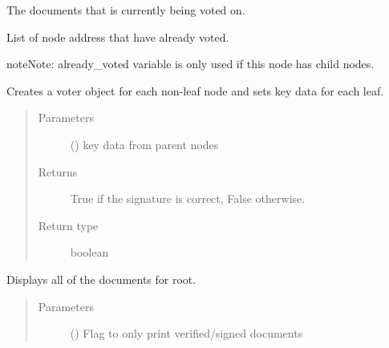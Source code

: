 \documentclass[letterpaper,10pt,english]{sphinxmanual}
\begin{document}
\begin{fulllineitems}
\begin{fulllineitems}
\label{\detokenize{index:ThresTree.TreeNode.current_vote}}
 \textendash{} The documents that is currently being voted on.

\end{fulllineitems}


\begin{fulllineitems}
\label{\detokenize{index:ThresTree.TreeNode.already_voted}}
 \textendash{} List of node address that have already voted.

\end{fulllineitems}


\begin{sphinxadmonition}{note}{Note:}
already\_voted variable is only used if this node has child nodes.
\end{sphinxadmonition}

\begin{fulllineitems}
\label{\detokenize{index:ThresTree.TreeNode.finalize}}
Creates a voter object for each non-leaf node and sets key data for each leaf.
\begin{quote}\begin{description}
\item[{Parameters}] \leavevmode
{} (\sphinxstyleliteralemphasis{, }) \textendash{} key data from parent nodes

\item[{Returns}] \leavevmode
True if the signature is correct, False otherwise.

\item[{Return type}] \leavevmode
boolean

\end{description}\end{quote}

\end{fulllineitems}


\begin{fulllineitems}
\label{\detokenize{index:ThresTree.TreeNode.show_documents}}
Displays all of the documents for root.
\begin{quote}\begin{description}
\item[{Parameters}] \leavevmode
{} () \textendash{} Flag to only print verified/signed documents


\end{description}
\end{quote}
\end{fulllineitems}
\end{fulllineitems}
\end{document}
